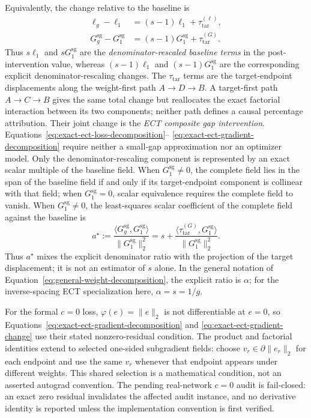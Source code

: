 \documentclass{article}
\begin{document}
Equivalently, the change relative to the baseline is
\begin{align}
  \ell_g-\ell_1
  &=(s-1)\ell_1+\tau^{(\ell)}_{\mathrm{tar}},
  \label{eq:exact-ect-loss-change}\\
  G_g^{\mathrm{sg}}-G_1^{\mathrm{sg}}
  &=(s-1)G_1^{\mathrm{sg}}+\tau^{(G)}_{\mathrm{tar}}.
  \label{eq:exact-ect-gradient-change}
\end{align}
Thus $s\ell_1$ and $sG_1^{\mathrm{sg}}$ are the
\emph{denominator-rescaled baseline terms} in the post-intervention value,
whereas $(s-1)\ell_1$ and $(s-1)G_1^{\mathrm{sg}}$ are the corresponding
explicit denominator-rescaling changes. The $\tau_{\mathrm{tar}}$ terms are
the target-endpoint displacements along the weight-first path
$A\to D\to B$. A target-first path $A\to C\to B$ gives the same total change
but reallocates the exact factorial interaction between its two components;
neither path defines a causal percentage attribution. Their joint change is
the \emph{ECT composite gap intervention}.
Equations~\eqref{eq:exact-ect-loss-decomposition}--
\eqref{eq:exact-ect-gradient-decomposition} require neither a small-gap
approximation nor an optimizer model. Only the denominator-rescaling component
is represented by an exact scalar multiple of the baseline field. When
$G_1^{\mathrm{sg}}\neq0$, the complete field lies in the span of the baseline
field if and only if its target-endpoint component is collinear with that
field; when $G_1^{\mathrm{sg}}=0$, scalar equivalence requires the complete
field to vanish.
When $G_1^{\mathrm{sg}}\neq0$, the least-squares scalar coefficient of the
complete field against the baseline is
\begin{equation}
  a^\star
  :=\frac{\langle G_g^{\mathrm{sg}},G_1^{\mathrm{sg}}\rangle}
  {\lVert G_1^{\mathrm{sg}}\rVert_2^2}
  =s+
  \frac{\langle\tau^{(G)}_{\mathrm{tar}},G_1^{\mathrm{sg}}\rangle}
  {\lVert G_1^{\mathrm{sg}}\rVert_2^2}.
  \label{eq:best-scalar-mixes-components}
\end{equation}
Thus $a^\star$ mixes the explicit denominator ratio with the projection of
the target displacement; it is not an estimator of $s$ alone. In the general
notation of Equation~\eqref{eq:general-weight-decomposition}, the
explicit ratio is $\alpha$; for the inverse-spacing ECT specialization here,
$\alpha=s=1/g$.

For the formal $c=0$ loss, $\varphi(e)=\lVert e\rVert_2$ is not differentiable
at $e=0$, so Equations~\eqref{eq:exact-ect-gradient-decomposition} and
\eqref{eq:exact-ect-gradient-change} use their stated nonzero-residual
condition. The product and factorial identities extend to selected one-sided
subgradient fields: choose $v_r\in\partial\lVert e_r\rVert_2$ for each endpoint
and use the same $v_r$ whenever that endpoint appears under different weights.
This shared selection is a mathematical condition, not an asserted autograd
convention. The pending real-network $c=0$ audit is fail-closed: an exact zero
residual invalidates the affected audit instance, and no derivative identity is
reported unless the implementation convention is first verified.
\end{document}
